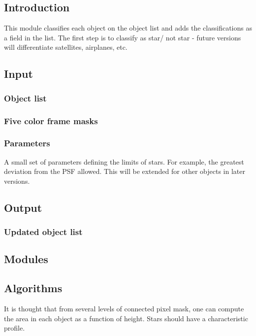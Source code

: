
\subsection{Introduction}

This module classifies each object on the object list and adds the
classifications as a field in the list.  The first step is to classify
as star/ not star - future versions will differentiate satellites, airplanes,
etc.

\subsection{Input}

\subsubsection{Object list}
\subsubsection{Five color frame masks}
\subsubsection{Parameters}
A small set of parameters defining the limits of stars.  For
example, the greatest deviation from the PSF allowed.  This will be
extended for other objects in later versions.

\subsection{Output}

\subsubsection{Updated object list}

\subsection{Modules}

\subsection{Algorithms}

It is thought that from several levels of connected pixel mask, one can
compute the area in each object as a function of height.  Stars should
have a characteristic profile.

